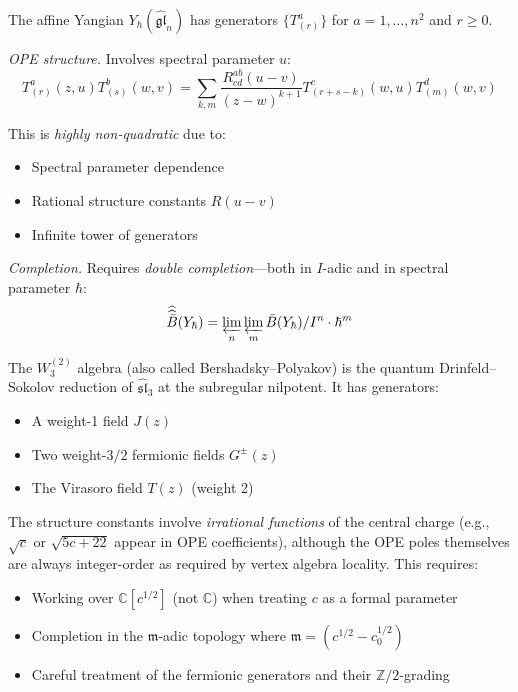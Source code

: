 \begin{example}\label{ex:affine-yangian-kp}
\label{ex:yangian-completion}

The affine Yangian $Y_\hbar(\widehat{\mathfrak{gl}}_n)$ has generators $\{T^a_{(r)}\}$ for $a = 1, \ldots, n^2$ and $r \geq 0$.

\emph{OPE structure.} Involves spectral parameter $u$:
\[T^a_{(r)}(z, u) T^b_{(s)}(w, v) = \sum_{k,m} \frac{R^{ab}_{cd}(u-v)}{(z-w)^{k+1}} T^c_{(r+s-k)}(w,u) T^d_{(m)}(w,v)\]

This is \emph{highly non-quadratic} due to:
\begin{itemize}
\item Spectral parameter dependence
\item Rational structure constants $R(u-v)$
\item Infinite tower of generators
\end{itemize}

\emph{Completion.} Requires \emph{double completion}---both in $I$-adic and in spectral parameter $\hbar$:
\[\widehat{\widehat{\bar{B}}}(Y_\hbar) = \varprojlim_n \varprojlim_m \bar{B}(Y_\hbar)/I^n \cdot \hbar^m\]
\end{example}

\begin{example}
\label{ex:bp-algebra}

The $W_3^{(2)}$ algebra (also called Bershadsky--Polyakov) is the quantum Drinfeld--Sokolov reduction of $\widehat{\mathfrak{sl}}_3$ at the subregular nilpotent.  It has generators:
\begin{itemize}
\item A weight-1 field $J(z)$
\item Two weight-$3/2$ fermionic fields $G^{\pm}(z)$
\item The Virasoro field $T(z)$ (weight 2)
\end{itemize}

The structure constants involve \emph{irrational functions} of the central charge (e.g., $\sqrt{c}$ or $\sqrt{5c+22}$ appear in OPE coefficients), although the OPE poles themselves are always integer-order as required by vertex algebra locality.  This requires:
\begin{itemize}
\item Working over $\mathbb{C}[c^{1/2}]$ (not $\mathbb{C}$) when treating $c$ as a formal parameter
\item Completion in the $\mathfrak{m}$-adic topology where $\mathfrak{m} = (c^{1/2} - c_0^{1/2})$
\item Careful treatment of the fermionic generators and their $\mathbb{Z}/2$-grading
\end{itemize}
\end{example}

